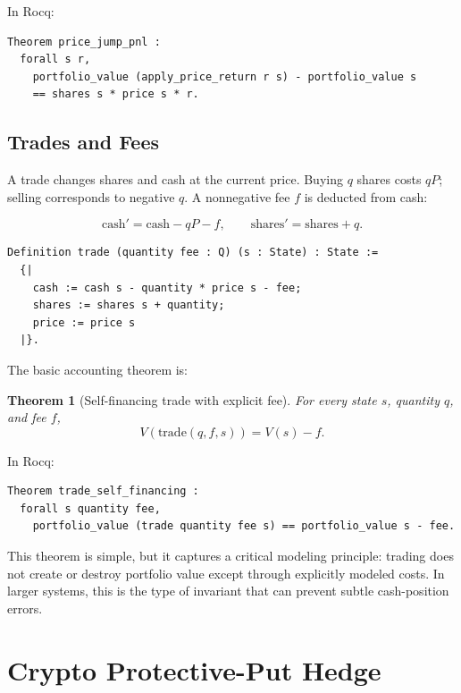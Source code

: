 \documentclass[11pt]{article}
\newtheorem{theorem}{Theorem}
\begin{document}
In Rocq:

\begin{lstlisting}[language=Coq]
Theorem price_jump_pnl :
  forall s r,
    portfolio_value (apply_price_return r s) - portfolio_value s
    == shares s * price s * r.
\end{lstlisting}

\subsection{Trades and Fees}

A trade changes shares and cash at the current price. Buying \(q\) shares costs
\(qP\); selling corresponds to negative \(q\). A nonnegative fee \(f\) is
deducted from cash:

\[
  \mathrm{cash}' = \mathrm{cash} - qP - f,
  \qquad
  \mathrm{shares}' = \mathrm{shares} + q.
\]

\begin{lstlisting}[language=Coq]
Definition trade (quantity fee : Q) (s : State) : State :=
  {|
    cash := cash s - quantity * price s - fee;
    shares := shares s + quantity;
    price := price s
  |}.
\end{lstlisting}

The basic accounting theorem is:

\begin{theorem}[Self-financing trade with explicit fee]
For every state \(s\), quantity \(q\), and fee \(f\),
\[
  V(\mathrm{trade}(q,f,s)) = V(s) - f.
\]
\end{theorem}

In Rocq:

\begin{lstlisting}[language=Coq]
Theorem trade_self_financing :
  forall s quantity fee,
    portfolio_value (trade quantity fee s) == portfolio_value s - fee.
\end{lstlisting}

This theorem is simple, but it captures a critical modeling principle: trading
does not create or destroy portfolio value except through explicitly modeled
costs. In larger systems, this is the type of invariant that can prevent
subtle cash-position errors.

\section{Crypto Protective-Put Hedge}
\end{document}
